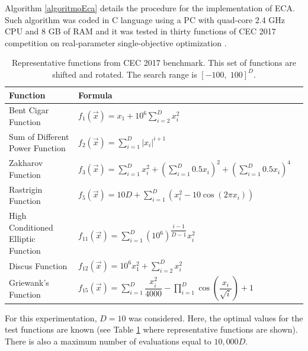 \documentclass{svproc}
\begin{document}
Algorithm \ref{algoritmoEca} details the procedure for the implementation 
of ECA. Such algorithm was coded in C language using a PC  with 
quad-core 2.4 GHz CPU and 8 GB of RAM and it was tested in thirty 
functions of CEC 2017 competition on real-parameter single-objective optimization \cite{cec2017}.\\
%
%
\begin{table}[!ht]
	\caption{Representative functions from CEC 2017 benchmark. This set of %
	functions are shifted  and rotated. The search range is $[-100,\; 100]^D$.}
	\label{tab:funcs}
	\begin{tabular}{llc}
		\hline
		Function & Formula    \\ \hline
		Bent Cigar Function & $ \displaystyle f_1(\vec{x}) = x_1 + 10^6 \sum_{i=2}^D x_i^2 $  \\ \hline
		Sum of Different Power Function & $ \displaystyle f_2(\vec{x}) = \sum_{i=1}^D |x_i|^{i+1} $  \\ \hline
		Zakharov Function & $ \displaystyle f_3(\vec{x}) =  \sum_{i=1}^D x_i^2 + \left(\sum_{i=1}^D 0.5x_i\right)^2 + \left(\sum_{i=1}^D 0.5x_i\right)^4 $  \\ \hline
		Rastrigin Function & $ \displaystyle f_5(\vec{x}) =  10D + \sum_{i=1}^D (x_i^2 - 10\cos(2\pi x_i)) $  \\ \hline
		High Conditioned Elliptic Function & $ \displaystyle f_{11}(\vec{x}) =  \sum_{i=1}^D (10^6)^{\dfrac{i-1}{D-1}} x_i^2 $  \\ \hline
		Discus Function & $ \displaystyle f_{12}(\vec{x}) = 10^6 x_1^2 +\sum_{i=2}^D x_i^2 $  \\ \hline
		Griewank’s Function & $ \displaystyle f_{15}(\vec{x}) =  \sum_{i=1}^D \dfrac{x_i^2}{4000} - \prod_{i=1}^D \cos\left( \dfrac{x_i}{\sqrt{i}} \right) + 1 $  \\ \hline
	\end{tabular}
\end{table}


For this experimentation, $D = 10$ was considered. Here, the optimal values for the test 
functions are known (see Table \ref{tab:funcs} where representative functions are shown). There is also a maximum number of 
evaluations equal to $10,000D$.\\
\end{document}

